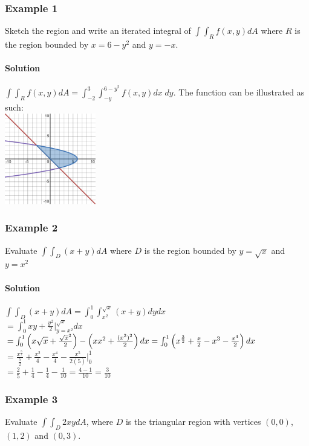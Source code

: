 \documentclass{article}
\newcommand{\Int}[2]{\int_{#1}^{#2}}
\newcommand{\eval}[2]{\bigg|_{#1}^{#2}}
\begin{document}
\subsubsection{Example 1}
Sketch the region and write an iterated integral of $\int\Int{R}{}f(x,y)dA$ where $R$ is the region bounded by $x=6-y^2$ and $y=-x$.
\paragraph{Solution}
$\int\Int{R}{}f(x,y)dA=\Int{-2}{3}\Int{-y}{6-y^2}f(x,y)dx\;dy$. The function can be illustrated as such:
\\\includegraphics[width=150px]{15-2-1.png}

\newpage\subsubsection{Example 2}
Evaluate $\int\Int{D}{}(x+y)dA$ where $D$ is the region bounded by $y=\sqrt{x}$ and $y=x^2$
\paragraph{Solution}
$\int\Int{D}{}(x+y)dA=\Int{0}{1}\Int{x^2}{\sqrt{x}}(x+y)dydx$
\\$=\Int{0}{1}xy+\frac{y^2}{2}\eval{y=x^2}{\sqrt{x}}dx$
\\$=\Int{0}{1}\left(x\sqrt{x}+\frac{\sqrt{x}^2}{2}\right)-\left(xx^2+\frac{(x^2)^2}{2}\right)dx
\\=\Int{0}{1}\left(x^{\frac{3}{2}}+\frac{x}{2}-x^3-\frac{x^4}{2}\right)dx$
\\$=\frac{x^{\frac{5}{2}}}{\frac{5}{2}}+\frac{x^2}{4}-\frac{x^4}{4}-\frac{x^5}{2(5)}\eval{0}{1}$
\\$=\frac{2}{5}+\frac{1}{4}-\frac{1}{4}-\frac{1}{10}=\frac{4-1}{10}=\frac{3}{10}$

\subsubsection{Example 3}
Evaluate $\int\Int{D}{}2xydA$, where $D$ is the triangular region with vertices $(0,0)$, $(1,2)$ and $(0,3)$.
\end{document}
